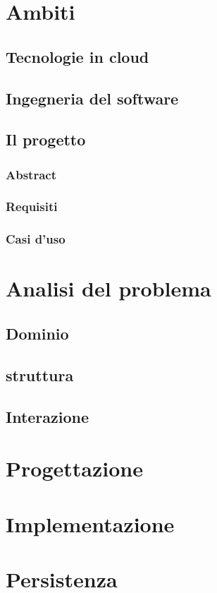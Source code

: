 \section{}
\subsection{}
\subsubsection{}
\subsubsection{}

\section{Ambiti}
\subsection{Tecnologie in cloud}
\subsection{Ingegneria del software}
\subsection{Il progetto}
\subsubsection{Abstract}
\subsubsection{Requisiti}
\subsubsection{Casi d'uso}

\section{Analisi del problema}
\subsection{Dominio}
\subsection{struttura}
\subsection{Interazione}

\section{Progettazione}

\section{Implementazione}

\section{Persistenza}
\subsection{}